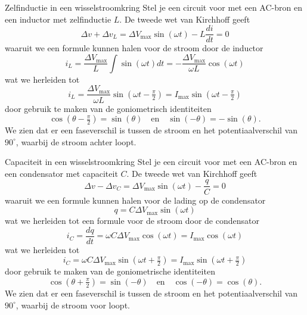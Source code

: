 \begin{pro}{Zelfinductie in een wisselstroomkring}
    Stel je een circuit voor met een AC-bron en een inductor met zelfinductie $L$. De tweede wet van Kirchhoff geeft
    \begin{equation*}
        \Delta v + \Delta v_L = \Delta V_{\text{max}}\sin(\omega t) - L\dfrac{di}{dt} = 0
    \end{equation*}
    waaruit we een formule kunnen halen voor de stroom door de inductor
    \begin{equation*}
        i_L = \dfrac{\Delta V_{\max}}{L}\int\sin(\omega t)dt = -\dfrac{\Delta V_{\max}}{\omega L}\cos(\omega t)
    \end{equation*}
    wat we herleiden tot 
    \begin{equation*}
        i_L = \dfrac{\Delta V_{\max}}{\omega L}\sin(\omega t - \tfrac{\pi}{2}) = I_{\max}\sin(\omega t - \tfrac{\pi}{2})
    \end{equation*}
    door gebruik te maken van de goniometrisch identiteiten 
    \begin{equation*}
        \cos(\theta - \tfrac{\pi}{2}) = \sin(\theta) \quad \text{en} \quad \sin(-\theta) = -\sin(\theta).
    \end{equation*}
    We zien dat er een faseverschil is tussen de stroom en het potentiaalverschil van $90^{\circ}$, waarbij de stroom achter loopt.
\end{pro}

\begin{pro}{Capaciteit in een wisselstroomkring}
    Stel je een circuit voor met een AC-bron en een condensator met capaciteit $C$. De tweede wet van Kirchhoff geeft
    \begin{equation*}
        \Delta v - \Delta v_{C} = \Delta V_{\max}\sin(\omega t) - \dfrac{q}{C} = 0
    \end{equation*}
    waaruit we een formule kunnen halen voor de lading op de condensator
    \begin{equation*}
        q = C\Delta V_{\max}\sin(\omega t)
    \end{equation*}
    wat we herleiden tot een formule voor de stroom door de condensator
    \begin{equation*}
        i_C = \dfrac{dq}{dt} = \omega C\Delta V_{\max}\cos(\omega t) = I_{\max}\cos(\omega t)
    \end{equation*}
    wat we herleiden tot
    \begin{equation*}
        i_C = \omega C\Delta V_{\max}\sin(\omega t + \tfrac{\pi}{2}) = I_{\max}\sin(\omega t + \tfrac{\pi}{2})
    \end{equation*}
    door gebruik te maken van de goniometrische identiteiten
    \begin{equation*}
        \cos(\theta + \tfrac{\pi}{2}) = \sin(-\theta) \quad \text{en} \quad \cos(-\theta) = \cos(\theta).
    \end{equation*}
    We zien dat er een faseverschil is tussen de stroom en het potentiaalverschil van $90^{\circ}$, waarbij de stroom voor loopt.
\end{pro}

